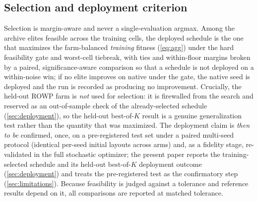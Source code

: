 \documentclass[11pt]{article}
\begin{document}
\subsection{Selection and deployment criterion}
\label{sec:selection}
Selection is margin-aware and never a single-evaluation argmax. Among the archive
elites feasible across the training cells, the deployed schedule is the one that maximizes
the farm-balanced \emph{training} fitness (\cref{eq:agg}) under the hard feasibility gate
and worst-cell tiebreak, with ties and within-floor margins broken by a paired,
significance-aware comparison so that a schedule is not deployed on a within-noise win; if
no elite improves on native under the gate, the native seed is deployed and the run is
recorded as producing no improvement. Crucially, the held-out ROWP farm is \emph{not}
used for selection: it is firewalled from the search and reserved as an out-of-sample
check of the already-selected schedule (\cref{sec:deployment}), so the held-out best-of-$K$
result is a genuine generalization test rather than the quantity that was maximized. The
deployment claim is \emph{then to be} confirmed, once, on a pre-registered test set under
a paired multi-seed protocol (identical per-seed initial layouts across arms) and, as a
fidelity stage, re-validated in the full stochastic optimizer; the present paper reports
the training-selected schedule and its held-out best-of-$K$ deployment outcome
(\cref{sec:deployment}) and treats the pre-registered test as the confirmatory step
(\cref{sec:limitations}). Because feasibility is judged against a tolerance and reference
results depend on it, all comparisons are reported at matched
tolerance.
\end{document}
